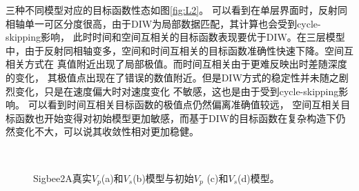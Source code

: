 三种不同模型对应的目标函数性态如图\ref{fig:L2}。
可以看到在单层界面时，反射同相轴单一可区分度很高，由于DIW为局部数据匹配，其计算也会受到cycle-skipping影响，
此时时间和空间互相关的目标函数表现要优于DIW。在三层模型中，由于反射同相轴变多，空间和时间互相关的目标函数准确性快速下降。空间互相关方式在
真值附近出现了局部极值。而时间互相关由于更难反映出时差随深度的变化，
其极值点出现在了错误的数值附近。但是DIW方式的稳定性并未随之剧烈变化，只是在速度偏大时对速度变化
不敏感，这也是由于受到cycle-skipping影响。
可以看到时间互相关目标函数的极值点仍然偏离准确值较远，
空间互相关目标函数也开始变得对初始模型更加敏感，而基于DIW的目标函数在复杂构造下仍然变化不大，可以说其收敛性相对更加稳健。

\begin{figure}[!htb]
   \centering
   \\
   \caption{Sigbee2A真实$V_p$(a)和$V_s$(b)模型与初始$V_p$ (c)和$V_s$(d)模型。}
   \label{fig:TrueAndInitial}
\end{figure}
